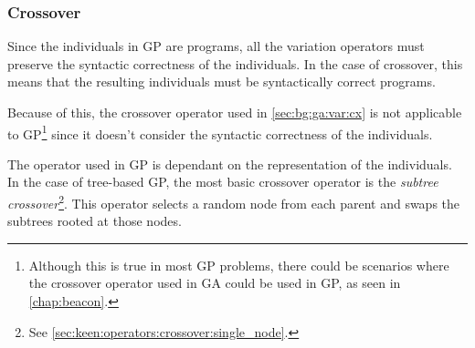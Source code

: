 \subsubsection{Crossover}
\label{sec:bg:gp:variation:crossover}
  Since the individuals in GP are programs, all the variation operators must
  preserve the syntactic correctness of the individuals.
  In the case of crossover, this means that the resulting individuals must be
  syntactically correct programs.
  
  Because of this, the crossover operator used in \vref{sec:bg:ga:var:cx} is not
  applicable to GP\footnote{%
    Although this is true in most GP problems, there could be scenarios where
    the crossover operator used in GA could be used in GP, as seen in
    \vref{chap:beacon}.
  } since it doesn't consider the syntactic correctness of the individuals.

  The operator used in GP is dependant on the representation of the individuals.
  In the case of tree-based GP, the most basic crossover operator is the
  \emph{subtree crossover}\footnote{%
    See \vref{sec:keen:operators:crossover:single_node}.
  }.
  This operator selects a random node from each parent and swaps the subtrees
  rooted at those nodes.
  
